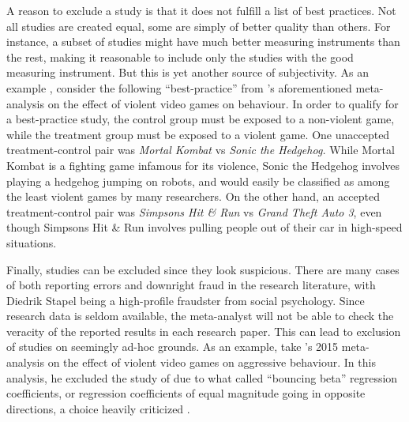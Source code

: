 A reason to exclude a study is that it does not fulfill a list of best practices. Not all studies are created equal, some are simply of better quality than others. For instance, a subset of studies might have much better measuring instruments than the rest, making it reasonable to include only the studies with the good measuring instrument. But this is yet another source of subjectivity. As an example \parencite[][p. 6]{lakens_reproducibility_2016}, consider the following ``best-practice'' from \textcite{Anderson2010-ki}'s aforementioned meta-analysis on the effect of violent video games  on behaviour. In order to qualify for a best-practice study, the control group must be exposed to a non-violent game, while the treatment group must be exposed to a violent game. One unaccepted treatment-control pair was \emph{Mortal Kombat} vs \emph{Sonic the Hedgehog.} While Mortal Kombat is a fighting game infamous for its violence, Sonic the Hedgehog involves playing a hedgehog jumping on robots, and would easily be classified as among the least violent games by many researchers. On the other hand, an accepted treatment-control pair was \emph{Simpsons Hit \& Run} vs \emph{Grand Theft Auto 3}, even though Simpsons Hit \& Run involves pulling people out of their car in high-speed situations. 

Finally, studies can be excluded since they look suspicious. There are many cases of both reporting errors \parencite{Nuijten2016-eu} and downright fraud in the research literature, with Diedrik Stapel being a high-profile fraudster from social psychology. Since research data is seldom available, the meta-analyst will not be able to check the veracity of the reported results in each research paper. This can lead to exclusion of studies on seemingly ad-hoc grounds. As an example, take 's 2015 meta-analysis on the effect of violent video games on aggressive behaviour. In this analysis, he excluded the study of \textcite{gentile_effects_2009} due to what \textcite{ferguson_angry_2015} called ``bouncing beta'' regression coefficients, or regression coefficients of equal magnitude going in opposite directions, a choice heavily criticized \textcite{gentile_what_2015}.

